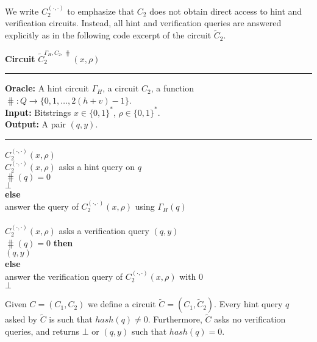 %
We write $C_2^{(\cdot, \cdot)}$ to emphasize that $C_2$ does not obtain direct access to hint and verification circuits.
Instead, all hint and verification queries are answered explicitly as in the following code excerpt of the circuit $\widetilde{C}_2$.
%
\begin{codeblock}
  \textbf{Circuit} $\widetilde{C}_2^{\Gamma_H, C_2, \hash} (x, \rho)$
  \medskip \hrule \medskip
  \textbf{Oracle:} A hint circuit $\Gamma_H$, a circuit $C_2$, a function $\hash : Q \rightarrow \{0,1,\dots, 2(h+v)-1\}$. \\
  \textbf{Input:} Bitstrings $x \in \{0,1\}^{*}$, $\rho \in \{0,1\}^{*}$. \\
  \textbf{Output:} A pair $(q, y)$.
  \medskip\hrule\medskip
  \Run $C_2^{(\cdot, \cdot)}(x, \rho)$ \\
  \IndI \If $C_2^{(\cdot, \cdot)}(x, \rho)$ asks a hint query on $q$ \Then\\
  \IndII \If $\hash(q) = 0$ \Then\\
  \IndIII \Return $\bot$\\
  \IndII \textbf{else}\\
  \IndIII answer the query of $C_2^{(\cdot, \cdot)}(x, \rho)$ using $\Gamma_H(q)$\\
  \\
  \IndI \If $C_2^{(\cdot, \cdot)}(x, \rho)$ asks a verification query $(q, y)$ \Then \\
  \IndII \If $\hash(q) = 0 $ \textbf{then} \\
  \IndIII \Return $(q, y)$ \\
  \IndII \textbf{else} \\
  \IndIII answer the verification query of $C_2^{(\cdot, \cdot)}(x, \rho)$ with 0 \\
  \Return $\bot$
\end{codeblock}
%
Given $C = (C_1, C_2)$ we define a circuit $\widetilde{C} = (C_1, \widetilde{C}_2)$.
Every hint query $q$ asked by $\widetilde{C}$ is such that $hash(q) \neq 0$.
Furthermore, $\widetilde{C}$ asks no verification queries, and returns $\bot$ or $(q,y)$ such that
$hash(q) = 0$.

